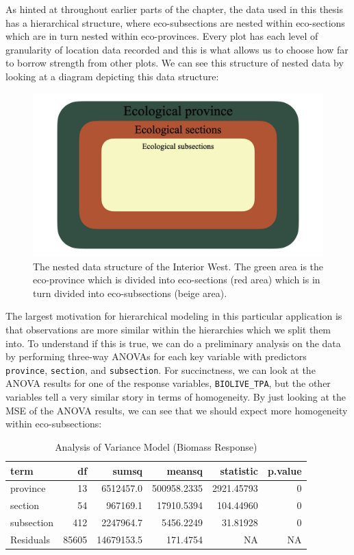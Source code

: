 \documentclass[12pt,twoside]{reedthesis}
\begin{document}
As hinted at throughout earlier parts of the chapter, the data used in this thesis has a hierarchical structure, where eco-subsections are nested within eco-sections which are in turn nested within eco-provinces. Every plot has each level of granularity of location data recorded and this is what allows us to choose how far to borrow strength from other plots. We can see this structure of nested data by looking at a diagram depicting this data structure:
\clearpage
\begin{figure}

{\centering \includegraphics[width=1\linewidth]{figure/data-structure} 

}

\caption[The nested data structure of the Interior West]{The nested data structure of the Interior West. The green area is the eco-province which is divided into eco-sections (red area) which is in turn divided into eco-subsections (beige area).}\label{fig:unnamed-chunk-9}
\end{figure}
The largest motivation for hierarchical modeling in this particular application is that observations are more similar within the hierarchies which we split them into. To understand if this is true, we can do a preliminary analysis on the data by performing three-way ANOVAs for each key variable with predictors \texttt{province}, \texttt{section}, and \texttt{subsection}. For succinctness, we can look at the ANOVA results for one of the response variables, \texttt{BIOLIVE\_TPA}, but the other variables tell a very similar story in terms of homogeneity. By just looking at the MSE of the ANOVA results, we can see that we should expect more homogeneity within eco-subsections:
\begin{longtable}[t]{lrrrrr}
\caption{\label{tab:unnamed-chunk-10}Analysis of Variance Model (Biomass Response)}\\
\toprule
term & df & sumsq & meansq & statistic & p.value\\
\midrule
province & 13 & 6512457.0 & 500958.2335 & 2921.45793 & 0\\
section & 54 & 967169.1 & 17910.5394 & 104.44960 & 0\\
subsection & 412 & 2247964.7 & 5456.2249 & 31.81928 & 0\\
Residuals & 85605 & 14679153.5 & 171.4754 & NA & NA\\
\bottomrule
\end{longtable}
\end{document}
